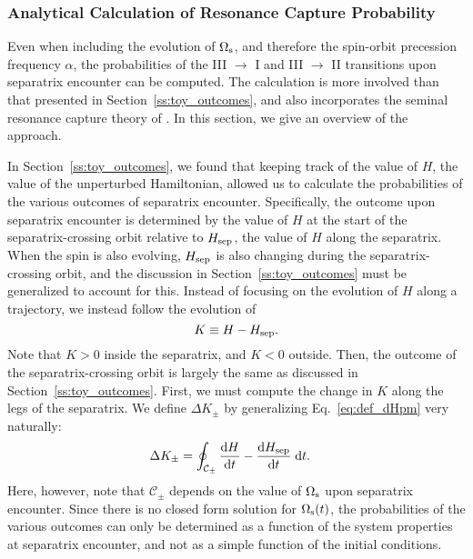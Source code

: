 \documentclass[
        fleqn,
        usenatbib,
    ]{mnras}
\newcommand*{\rd}[2]{\frac{\mathrm{d}#1}{\mathrm{d}#2}}
\begin{document}
\subsubsection{Analytical Calculation of Resonance Capture Probability
}\label{ss:phop_weaktide}

Even when including the evolution of $\Omega_{\rm s}$, and therefore the
spin-orbit precession frequency $\alpha$, the probabilities of the III $\to$ I
and III $\to$ II transitions upon separatrix encounter can be computed. The
calculation is more involved than that presented in
Section~\ref{ss:toy_outcomes}, and also incorporates the seminal resonance
capture theory of \citet{henrard1982}. In this section, we give an
overview of the approach.

In Section~\ref{ss:toy_outcomes}, we found that keeping track of the value of
$H$, the value of the
unperturbed Hamiltonian, allowed us to calculate the probabilities of the
various outcomes of separatrix encounter. Specifically, the outcome upon separatrix
encounter is determined by the value of $H$ at the start of the
separatrix-crossing orbit relative to $H_{\rm sep}$, the value of $H$ along the
separatrix. When the spin is also evolving, $H_{\rm sep}$ is also
changing during the separatrix-crossing orbit, and the discussion in
Section~\ref{ss:toy_outcomes} must be generalized to account for this. Instead
of focusing on the evolution of $H$ along a trajectory, we instead follow the
evolution of
\begin{equation}
    K \equiv H - H_{\rm sep}.
\end{equation}
Note that $K > 0$ inside the separatrix, and $K < 0$ outside. Then, the outcome
of the separatrix-crossing orbit is largely the same as discussed in
Section~\ref{ss:toy_outcomes}. First, we must compute the change in $K$ along
the legs of the separatrix. We define $\Delta K_{\pm}$ by generalizing
Eq.~\eqref{eq:def_dHpm} very naturally:
\begin{align}
    \Delta K_{\pm} &= \oint_{\mathcal{C}_{\pm}} \rd{H}{t}
        - \rd{H_{\rm sep}}{t}\;\mathrm{d}t.\label{eq:def_dK_weaktide}
\end{align}
Here, however, note that $\mathcal{C}_{\pm}$ depends on the value of
$\Omega_{\rm s}$ upon separatrix encounter. Since there is no closed form
solution for $\Omega_{\rm s}(t)$, the probabilities of the various outcomes can
only be determined as a function of the system properties at separatrix
encounter, and not as a simple function of the initial conditions.
\end{document}
